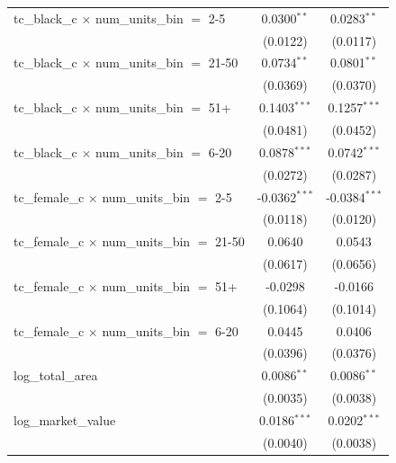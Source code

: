 \begin{tabular}{lcc}
   tc\_black\_c $\times$ num\_units\_bin $=$ 2-5         & 0.0300$^{**}$   & 0.0283$^{**}$\\   
                                                         & (0.0122)        & (0.0117)\\   
   tc\_black\_c $\times$ num\_units\_bin $=$ 21-50       & 0.0734$^{**}$   & 0.0801$^{**}$\\   
                                                         & (0.0369)        & (0.0370)\\   
   tc\_black\_c $\times$ num\_units\_bin $=$ 51+         & 0.1403$^{***}$  & 0.1257$^{***}$\\   
                                                         & (0.0481)        & (0.0452)\\   
   tc\_black\_c $\times$ num\_units\_bin $=$ 6-20        & 0.0878$^{***}$  & 0.0742$^{***}$\\   
                                                         & (0.0272)        & (0.0287)\\   
   tc\_female\_c $\times$ num\_units\_bin $=$ 2-5        & -0.0362$^{***}$ & -0.0384$^{***}$\\   
                                                         & (0.0118)        & (0.0120)\\   
   tc\_female\_c $\times$ num\_units\_bin $=$ 21-50      & 0.0640          & 0.0543\\   
                                                         & (0.0617)        & (0.0656)\\   
   tc\_female\_c $\times$ num\_units\_bin $=$ 51+        & -0.0298         & -0.0166\\   
                                                         & (0.1064)        & (0.1014)\\   
   tc\_female\_c $\times$ num\_units\_bin $=$ 6-20       & 0.0445          & 0.0406\\   
                                                         & (0.0396)        & (0.0376)\\   
   log\_total\_area                                      & 0.0086$^{**}$   & 0.0086$^{**}$\\   
                                                         & (0.0035)        & (0.0038)\\   
   log\_market\_value                                    & 0.0186$^{***}$  & 0.0202$^{***}$\\   
                                                         & (0.0040)        & (0.0038)\\   

\end{tabular}
